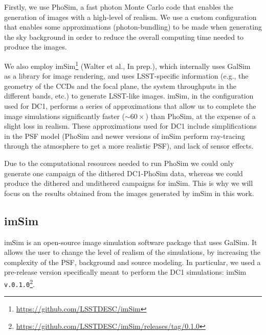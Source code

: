 \documentclass[\docopts]{\docclass}
\begin{document}
Firstly, we use PhoSim, a fast photon Monte Carlo code that enables the generation of images with a high-level of realism. We use a custom configuration that enables some
approximations (photon-bundling) to be made when generating the sky background in order to reduce the overall computing time needed to produce the images.

We also employ imSim\footnote{\url{https://github.com/LSSTDESC/imSim}} (Walter et al., In prep.), which internally uses GalSim~\citep{2015A&C....10..121R} as a library for image rendering, and uses LSST-specific information (e.g., the geometry of the CCDs and the focal plane, the system throughputs in the different bands, etc.) to generate LSST-like images. imSim, in the configuration used for DC1, performs a series of approximations that allow us to complete the image simulations significantly faster ($\sim 60\times$) than PhoSim, at the expense of a slight loss in realism. These approximations used for DC1 include simplifications in the PSF model (PhoSim and newer versions of imSim perform ray-tracing through the atmosphere to get a more realistic PSF), and lack of sensor effects. 

Due to the computational resources needed to run PhoSim we could only generate one campaign of the dithered DC1-PhoSim data, whereas we could produce the dithered and undithered campaigns for imSim. This is why we will focus on the results obtained from the images generated by imSim in this work.

\subsection{imSim}
\label{sec:imsim_pipeline}

imSim is an open-source image simulation software package that uses GalSim. It allows the user to change the level of realism of the simulations, by increasing the complexity of the PSF, background and source modeling. In particular, we used a pre-release version specifically meant to perform the DC1 simulations: imSim \texttt{v.0.1.0}\footnote{\url{https://github.com/LSSTDESC/imSim/releases/tag/0.1.0}}.
\end{document}
